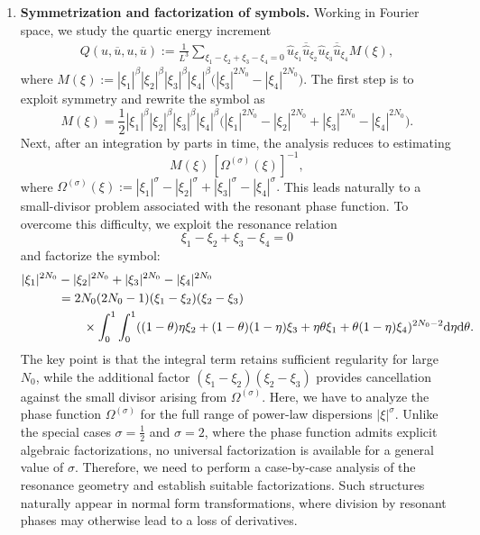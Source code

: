 \documentclass[UTF-8,reqno]{amsart}
\numberwithin{equation}{section}
\theoremstyle{definition}
\def\dif{{\mathord{{\rm d}}}}
\def\dif{{\mathord{{\rm d}}}}
\begin{document}
\begin{enumerate}
\item \textbf{Symmetrization and factorization of symbols.} 
Working in Fourier space, we study the quartic energy increment
\begin{align*}
Q(u,\overline u,u,\overline u)
:=
\frac{1}{L^{3}}
\sum_{\xi_1-\xi_2+\xi_3-\xi_4=0}
\widehat{u}_{\xi_1}\overline{\widehat{u}}_{\xi_2}
\widehat{u}_{\xi_3}\overline{\widehat{u}}_{\xi_4}
M(\xi),
\end{align*}
where $M(\xi)
:=
|\xi_1|^\beta|\xi_2|^\beta|\xi_3|^\beta|\xi_4|^\beta
\bigl(|\xi_3|^{2N_0}-|\xi_4|^{2N_0}\bigr).$ The first step is to exploit symmetry and rewrite the symbol as
\[
M(\xi)
=
\frac12
|\xi_1|^\beta|\xi_2|^\beta|\xi_3|^\beta|\xi_4|^\beta
\bigl(
|\xi_1|^{2N_0}-|\xi_2|^{2N_0}
+
|\xi_3|^{2N_0}-|\xi_4|^{2N_0}
\bigr).
\]
Next, after an integration by parts in time, the analysis reduces to estimating
\[
M(\xi)\,[\Omega^{(\sigma)}(\xi)]^{-1},
\]
where $\Omega^{(\sigma)}(\xi)
:=
|\xi_1|^\sigma-|\xi_2|^\sigma
+
|\xi_3|^\sigma-|\xi_4|^\sigma.$ 
This leads naturally to a small-divisor problem associated with the resonant phase function.
To overcome this difficulty, we exploit the resonance relation
\[
\xi_1-\xi_2+\xi_3-\xi_4=0
\]
and factorize the symbol:
 \begin{align*}
    |\xi_1|^{2N_0}&-|\xi_2|^{2N_0}+|\xi_3|^{2N_0}-|\xi_4|^{2N_0}\\
    &=2N_0(2N_0-1)
     (\xi_1-\xi_2)(\xi_2-\xi_3)\\
     &\quad\quad \times \int_0^1\int_0^1((1-\theta)\eta\xi_2+(1-\theta)(1-\eta)\xi_3+\eta\theta\xi_1+\theta(1-\eta)\xi_4)^{2N_0-2}\dif \eta\dif\theta.
\end{align*}
The key point is that the integral term retains sufficient regularity for large $N_0$, while the additional factor $(\xi_1-\xi_2)(\xi_2-\xi_3)$
provides cancellation against the small divisor arising from $\Omega^{(\sigma)}$.  Here, we have to analyze the phase function
$\Omega^{(\sigma)}$ for the full range of power-law dispersions
$|\xi|^\sigma$. Unlike the special cases $\sigma=\frac12$ and
$\sigma=2$, where the phase function admits explicit algebraic
factorizations, no universal factorization is available for a general
value of $\sigma$. Therefore, we need to perform a case-by-case analysis
of the resonance geometry and establish suitable factorizations.
Such structures naturally appear in normal form transformations, where division by resonant phases may otherwise lead to a loss of derivatives.


\end{enumerate}
\end{document}
